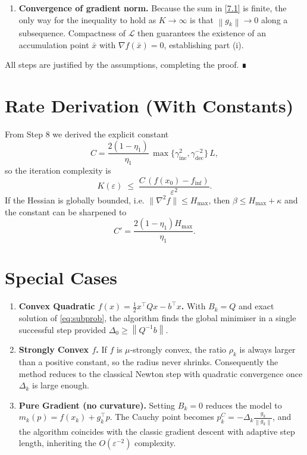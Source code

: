 \documentclass{article}
\newcommand{\norm}[1]{\left\lVert#1\right\rVert}
\begin{document}
\begin{enumerate}
\item[Step 10.] \textbf{Convergence of gradient norm.}
Because the sum in \eqref{7.1} is finite, the only way for the inequality to
hold as $K\to\infty$ is that $\norm{g_k}\to0$ along a subsequence.
Compactness of $\mathcal{L}$ then guarantees the existence of an
accumulation point $\bar x$ with $\nabla f(\bar x)=0$, establishing part
(i).

\end{enumerate}
All steps are justified by the assumptions, completing the proof. ∎

\section*{Rate Derivation (With Constants)}
From Step 8 we derived the explicit constant
\[
C = \frac{2(1-\eta_1)}{\eta_1}\,
    \max\!\big\{\gamma_{\text{inc}}^{2},\gamma_{\text{dec}}^{-2}\big\}\,L,
\]
so the iteration complexity is
\[
K(\varepsilon)\;\le\;
\frac{C\,(f(x_0)-f_{\inf})}{\varepsilon^{2}}.
\]
If the Hessian is globally bounded, i.e. $\| \nabla^{2}f\|\le H_{\max}$,
then $\beta\le H_{\max}+\kappa$ and the constant can be sharpened to
\[
C'=\frac{2(1-\eta_1)H_{\max}}{\eta_1}.
\]

\section*{Special Cases}
\begin{enumerate}
\item \textbf{Convex Quadratic $f(x)=\frac12x^{\top}Qx-b^{\top}x$.}
   With $B_k=Q$ and exact solution of \eqref{eq:subprob},
   the algorithm finds the global minimiser in a single successful step
   provided $\Delta_0\ge \norm{Q^{-1}b}$.

\item \textbf{Strongly Convex $f$.}
   If $f$ is $\mu$‑strongly convex, the ratio $\rho_k$ is always larger
   than a positive constant, so the radius never shrinks.  Consequently
   the method reduces to the classical Newton step with quadratic
   convergence once $\Delta_k$ is large enough.

\item \textbf{Pure Gradient (no curvature).}
   Setting $B_k=0$ reduces the model to $m_k(p)=f(x_k)+g_k^{\top}p$.
   The Cauchy point becomes $p_k^{C}= -\Delta_k \frac{g_k}{\norm{g_k}}$,
   and the algorithm coincides with the classic gradient descent with
   adaptive step length, inheriting the $O(\varepsilon^{-2})$ complexity.
\end{enumerate}
\end{document}
